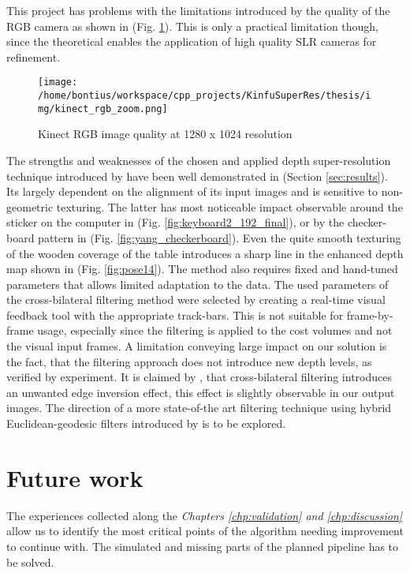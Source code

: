 \documentclass{ucl_thesis}
\newcommand{\figref}[1]{(Fig. \ref{#1})}
\newcommand{\secref}[1]{(Section \ref{#1})}
\begin{document}
This project has problems with the limitations introduced by the quality of the RGB camera as shown in \figref{fig:kinect_rgb_zoom}. This is only a practical limitation though, since the theoretical enables the application of high quality SLR cameras for refinement.

\begin{figure}[h!]\centering
        \texttt{[image: /home/bontius/workspace/cpp\_projects/KinfuSuperRes/thesis/img/kinect\_rgb\_zoom.png]}
        \caption{Kinect RGB image quality at 1280 x 1024 resolution}
        \label{fig:kinect_rgb_zoom}
\end{figure}

\par The strengths and weaknesses of the chosen and applied depth super-resolution technique introduced by \citep{cvpr-07-qingxiong-yang} have been well demonstrated in \secref{sec:results}. Its largely dependent on the alignment of its input images and is sensitive to non-geometric texturing. The latter has most noticeable impact observable around the sticker on the computer in \figref{fig:keyboard2_192_final}, or by the checker-board pattern in  \figref{fig:yang_checkerboard}. Even the quite smooth texturing of the wooden coverage of the table introduces a sharp line in the enhanced depth map shown in \figref{fig:pose14}. The method also requires fixed and hand-tuned parameters that allows limited adaptation to the data. The used parameters of the cross-bilateral filtering method were selected by creating a real-time visual feedback tool with the appropriate track-bars. This is not suitable for frame-by-frame usage, especially since the filtering is applied to the cost volumes and not the visual input frames. A limitation conveying large impact on our solution is the fact, that the filtering approach does not introduce new depth levels, as verified by experiment.
It is claimed by \citep{guided_filter}, that cross-bilateral filtering introduces an unwanted edge inversion effect, this effect is slightly observable in our output images. The direction of a more state-of-the art filtering technique using hybrid Euclidean-geodesic filters introduced by \citep{Gastal:2012} is to be explored.
    
\section{Future work}
\label{sec:future_work}

\par The experiences collected along the {\it Chapters \ref{chp:validation} and \ref{chp:discussion}} allow us to identify the most critical points of the algorithm needing improvement to continue with. The simulated and missing parts of the planned pipeline has to be solved. 
\end{document}
